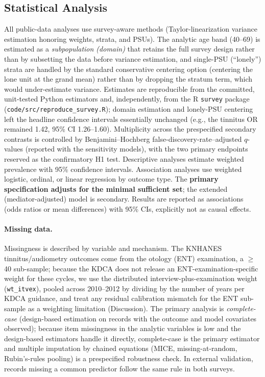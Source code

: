 \subsection{Statistical Analysis}
All public-data analyses use survey-aware methods (Taylor-linearization variance estimation honoring weights, strata, and PSUs). The analytic age band (40--69) is estimated as a \emph{subpopulation (domain)} that retains the full survey design rather than by subsetting the data before variance estimation, and single-PSU (``lonely'') strata are handled by the standard conservative centering option (centering the lone unit at the grand mean) rather than by dropping the stratum term, which would under-estimate variance. Estimates are reproducible from the committed, unit-tested Python estimators and, independently, from the R \texttt{survey} package (\texttt{code/src/reproduce\_survey.R}); domain estimation and lonely-PSU centering left the headline confidence intervals essentially unchanged (e.g., the tinnitus OR remained 1.42, 95\% CI 1.26--1.60). Multiplicity across the prespecified secondary contrasts is controlled by Benjamini--Hochberg false-discovery-rate--adjusted $q$-values (reported with the sensitivity models), with the two primary endpoints reserved as the confirmatory H1 test. Descriptive analyses estimate weighted prevalence with 95\% confidence intervals. Association analyses use weighted logistic, ordinal, or linear regression by outcome type. The \textbf{primary specification adjusts for the minimal sufficient set}; the extended (mediator-adjusted) model is secondary. Results are reported as associations (odds ratios or mean differences) with 95\% CIs, explicitly not as causal effects.

\paragraph{Missing data.} Missingness is described by variable and mechanism. The KNHANES tinnitus/audiometry outcomes come from the otology (ENT) examination, a $\geq$40 sub-sample; because the KDCA does not release an ENT-examination-specific weight for these cycles, we use the distributed interview-plus-examination weight (\texttt{wt\_itvex}), pooled across 2010--2012 by dividing by the number of years per KDCA guidance, and treat any residual calibration mismatch for the ENT sub-sample as a weighting limitation (Discussion). The primary analysis is \emph{complete-case} (design-based estimation on records with the outcome and model covariates observed); because item missingness in the analytic variables is low and the design-based estimators handle it directly, complete-case is the primary estimator and multiple imputation by chained equations (MICE, missing-at-random, Rubin's-rules pooling) is a prespecified robustness check. In external validation, records missing a common predictor follow the same rule in both surveys.

